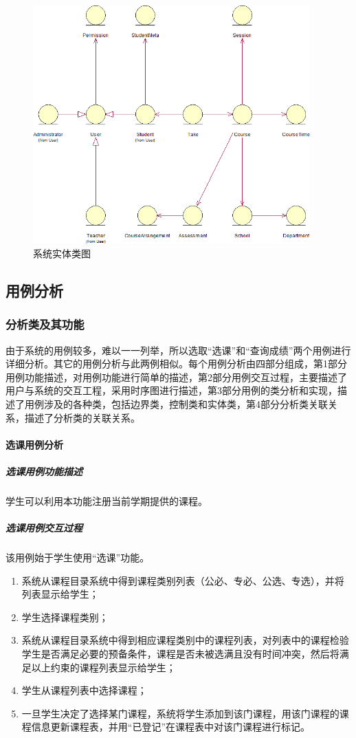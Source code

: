 \begin{figure}[H]
  \centering
  \includegraphics[width=0.95\textwidth]{img/system_entity}
  \caption{系统实体类图}
  \label{fig:system_entity}
\end{figure}
\subsection{用例分析}
\subsubsection{分析类及其功能}
由于系统的用例较多，难以一一列举，所以选取“选课”和“查询成绩”两个用例进行详细分析。其它的用例分析与此两例相似。每个用例分析由四部分组成，第1部分用例功能描述，对用例功能进行简单的描述，第2部分用例交互过程，主要描述了用户与系统的交互工程，采用时序图进行描述，第3部分用例的类分析和实现，描述了用例涉及的各种类，包括边界类，控制类和实体类，第4部分分析类关联关系，描述了分析类的关联关系。

\paragraph{选课用例分析}
\subparagraph{选课用例功能描述}
学生可以利用本功能注册当前学期提供的课程。

\subparagraph{选课用例交互过程}
    
该用例始于学生使用“选课”功能。
    
\begin{enumerate}
  \item 系统从课程目录系统中得到课程类别列表（公必、专必、公选、专选），并将列表显示给学生；
  \item 学生选择课程类别；
  \item 系统从课程目录系统中得到相应课程类别中的课程列表，对列表中的课程检验学生是否满足必要的预备条件，课程是否未被选满且没有时间冲突，然后将满足以上约束的课程列表显示给学生；
  \item 学生从课程列表中选择课程；
  \item 一旦学生决定了选择某门课程，系统将学生添加到该门课程，用该门课程的课程信息更新课程表，并用“已登记”在课程表中对该门课程进行标记。
\end{enumerate}
    
